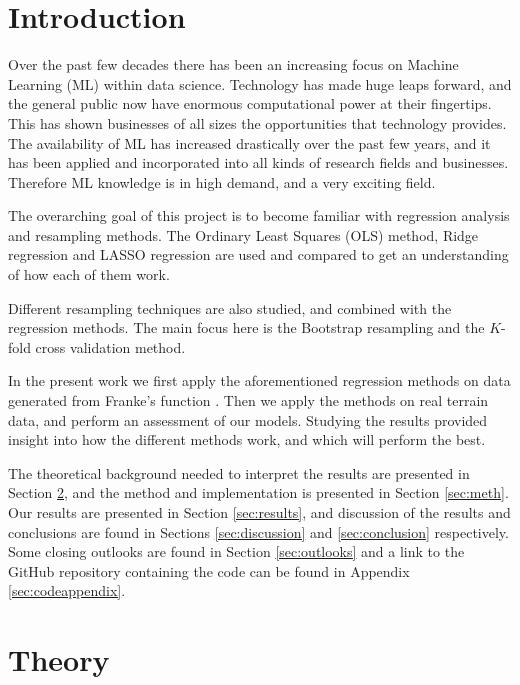 \documentclass[norsk,a4paper,12pt]{article}
\begin{document}
\setlength{\columnsep}{18pt}
\begin{multicols}{2}

\section{Introduction}\label{sec:intro}
Over the past few decades there has been an increasing focus on Machine Learning (ML) within data science. Technology has made huge leaps forward, and the general public now have enormous computational power at their fingertips. This has shown businesses of all sizes the opportunities that technology provides. The availability of ML has increased drastically over the past few years, and it has been applied and incorporated into all kinds of research fields and businesses. Therefore ML knowledge is in high demand, and a very exciting field.

The overarching goal of this project is to become familiar with regression analysis and resampling methods. The Ordinary Least Squares (OLS) method, Ridge regression and LASSO regression are used and compared to get an understanding of how each of them work. 

Different resampling techniques are also studied, and combined with the regression methods. The main focus here is the Bootstrap resampling and the $K$-fold cross validation method.

In the present work we first apply the aforementioned regression methods on data generated from Franke's function \cite{franke}. Then we apply the methods on real terrain data, and perform an assessment of our models. Studying the results provided insight into how the different methods work, and which will perform the best.

The theoretical background needed to interpret the results are presented in Section \ref{sec:theory}, and the method and implementation is presented in Section \ref{sec:meth}. Our results are presented in Section \ref{sec:results}, and discussion of the results and conclusions are found in Sections \ref{sec:discussion} and \ref{sec:conclusion} respectively. Some closing outlooks are found in Section \ref{sec:outlooks} and a link to the GitHub repository containing the code can be found in Appendix \ref{sec:codeappendix}.


\section{Theory}\label{sec:theory}


\end{multicols}
\end{document}

